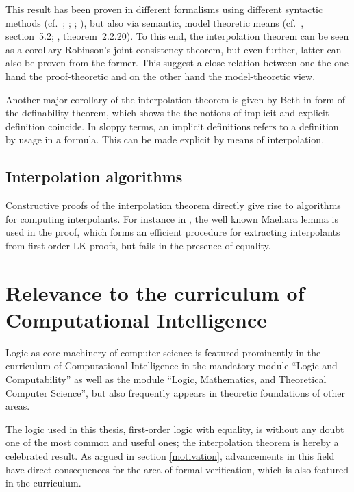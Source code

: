 \documentclass[,%
			paper=a4,%
			DIV12,
			liststotoc,
			bibtotoc,
			draft=false,%
			numbers=noendperiod
			]{scrartcl}
\theoremstyle{definition}
\begin{document}
This result has been proven in different formalisms using different syntactic methods (cf.~\cite{craig57linear}; \cite{takeuti1987proof}; \cite{krajivcek1997interpolation}; \cite{Pudlak97}), but also via semantic, model theoretic means (cf.\ \cite{shoenfield1967mathematical}, section~5.2; \cite{chang1990model}, theorem~2.2.20).
To this end, the interpolation theorem can be seen as a corollary Robinson's joint consistency theorem, but even further, latter can also be proven from the former. 
This suggest a close relation between one the one hand the proof-theoretic and on the other hand the model-theoretic view.

Another major corollary of the interpolation theorem is given by Beth in form of the definability theorem, which shows the the notions of implicit and explicit definition coincide. In sloppy terms, an implicit definitions refers to a definition by usage in a formula. This can be made explicit by means of interpolation.


\subsection{Interpolation algorithms}

Constructive proofs of the interpolation theorem directly give rise to algorithms for computing interpolants. For instance in \cite{takeuti1987proof}, the well known Maehara lemma is used in the proof, which forms an efficient procedure for extracting interpolants from first-order LK proofs, but fails in the presence of equality.





\section{Relevance to the curriculum of Computational Intelligence}

Logic as core machinery of computer science is featured prominently in the curriculum of Computational Intelligence in the mandatory module ``Logic and Computability'' as well as the module ``Logic, Mathematics, and Theoretical Computer Science'', but also frequently appears in theoretic foundations of other areas. 

The logic used in this thesis, first-order logic with equality, is without any doubt one of the most common and useful ones; the interpolation theorem is hereby a celebrated result.
As argued in section \ref{motivation}, advancements in this field have direct consequences for the area of formal verification, which is also featured in the curriculum.
\end{document}
